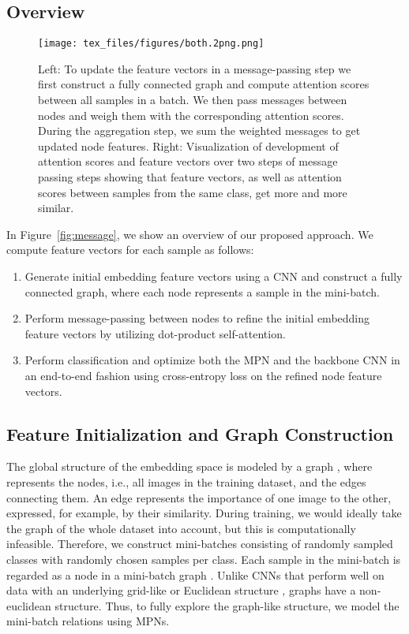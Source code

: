 \documentclass{article}
\begin{document}
\subsection{Overview}
\label{subsec:overview}

\begin{figure*}
\centerline{\texttt{[image: tex\_files/figures/both.2png.png]}}
   \caption{Left: To update the feature vectors in a message-passing step we first construct a fully connected graph and compute attention scores between all samples in a batch. We then pass messages between nodes and weigh them with the corresponding attention scores. During the aggregation step, we sum the weighted messages to get updated node features. 
Right: Visualization of development of attention scores and feature vectors over two steps of message passing steps showing that feature vectors, as well as attention scores between samples from the same class, get more and more similar.}
   \vspace{+0.3cm}
\label{fig:mpn2}
\end{figure*}



In Figure~\ref{fig:message}, we show an overview of our proposed approach. We compute feature vectors for each sample as follows:

\begin{enumerate}
    \item Generate initial embedding feature vectors using a CNN and construct a fully connected graph, where each node represents a sample in the mini-batch.
    \item Perform message-passing between nodes to refine the initial embedding feature vectors by utilizing dot-product self-attention.
    \item Perform classification and optimize both the MPN and the backbone CNN in an end-to-end fashion using cross-entropy loss on the refined node feature vectors. 
\end{enumerate}
\vspace{-0.3cm}
\subsection{Feature Initialization and Graph Construction}
\label{subsec:init}

The global structure of the embedding space is modeled by a graph , where  represents the nodes, i.e., all images in the training dataset, and  the edges connecting them. An edge represents the importance of one image to the other, expressed, for example, by their similarity.
During training, we would ideally take the graph of the whole dataset into account, but this is computationally infeasible. Therefore, we construct mini-batches consisting of  randomly sampled classes with  randomly chosen samples per class. Each sample in the mini-batch is regarded as a node in a mini-batch graph .
Unlike CNNs that perform well on data with an underlying grid-like or Euclidean structure \cite{GeoDeepL}, graphs have a non-euclidean structure. Thus, to fully explore the graph-like structure, we model the mini-batch relations using MPNs. 
\end{document}
